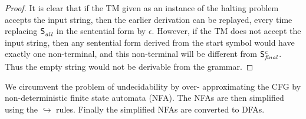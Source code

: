 \documentclass[preprint, 9pt]{sigplanconf}
\begin{document}
\begin{proof}
It is clear that if the TM given as an instance of the halting problem
accepts the input string, then the earlier derivation can be replayed,
every time replacing   $\mathsf{S}_{\mathit{\mathit{all}}}^{}$   in   the  sentential   form   by
$\epsilon$. However,  if the TM  does not accept the  input string,
then  any sentential  form derived  from the  start symbol  would have
exactly one non-terminal, and this non-terminal will be different from
$\mathsf{S}_{\mathit{final}}^{c}$.  Thus  the  empty   string  would  not  be
derivable from the grammar.
\end{proof}


We circumvent  the problem  of undecidability  by over-
approximating the CFG by non-deterministic finite state
automata (NFA). The NFAs  are then simplified using the
$\hookrightarrow$ rules.   Finally the  simplified NFAs
are converted to DFAs.

\end{document}
